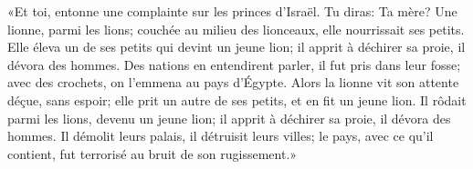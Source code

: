«Et toi, entonne une complainte sur les princes d’Israël.
Tu diras: Ta mère? Une lionne, parmi les lions;
	couchée au milieu des lionceaux, elle nourrissait ses petits.
Elle éleva un de ses petits qui devint un jeune lion;
	il apprit à déchirer sa proie, il dévora des hommes.
Des nations en entendirent parler, il fut pris dans leur fosse;
	avec des crochets, on l’emmena au pays d’Égypte.
Alors la lionne vit son attente déçue, sans espoir;
	elle prit un autre de ses petits, et en fit un jeune lion.
Il rôdait parmi les lions, devenu un jeune lion;
	il apprit à déchirer sa proie, il dévora des hommes.
Il démolit leurs palais, il détruisit leurs villes;
	le pays, avec ce qu’il contient, fut terrorisé au bruit de son rugissement.»
